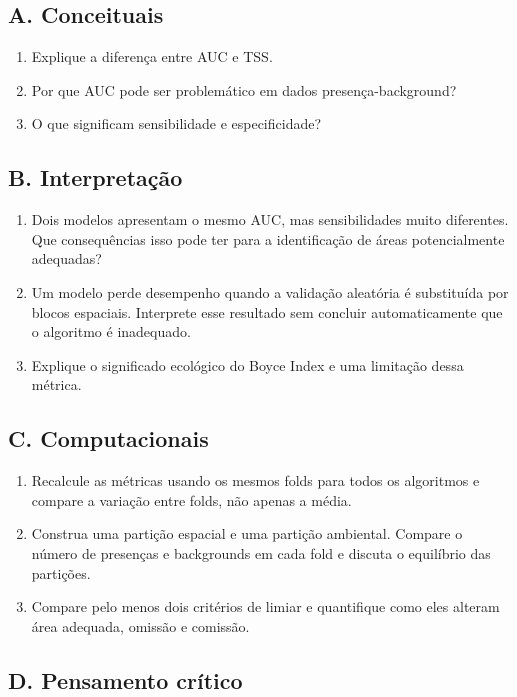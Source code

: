 \subsection*{A. Conceituais}

\begin{enumerate}
	\item Explique a diferença entre AUC e TSS.
	\item Por que AUC pode ser problemático em dados presença-background?
	\item O que significam sensibilidade e especificidade?
\end{enumerate}

\subsection*{B. Interpretação}

\begin{enumerate}[resume]
	\item Dois modelos apresentam o mesmo AUC, mas sensibilidades muito
	diferentes. Que consequências isso pode ter para a identificação de áreas
	potencialmente adequadas?
	\item Um modelo perde desempenho quando a validação aleatória é substituída
	por blocos espaciais. Interprete esse resultado sem concluir automaticamente
	que o algoritmo é inadequado.
	\item Explique o significado ecológico do Boyce Index e uma limitação dessa
	métrica.
\end{enumerate}

\subsection*{C. Computacionais}

\begin{enumerate}[resume]
	\item Recalcule as métricas usando os mesmos folds para todos os algoritmos e
	compare a variação entre folds, não apenas a média.
	\item Construa uma partição espacial e uma partição ambiental. Compare o
	número de presenças e backgrounds em cada fold e discuta o equilíbrio das
	partições.
	\item Compare pelo menos dois critérios de limiar e quantifique como eles
	alteram área adequada, omissão e comissão.
\end{enumerate}

\subsection*{D. Pensamento crítico}


